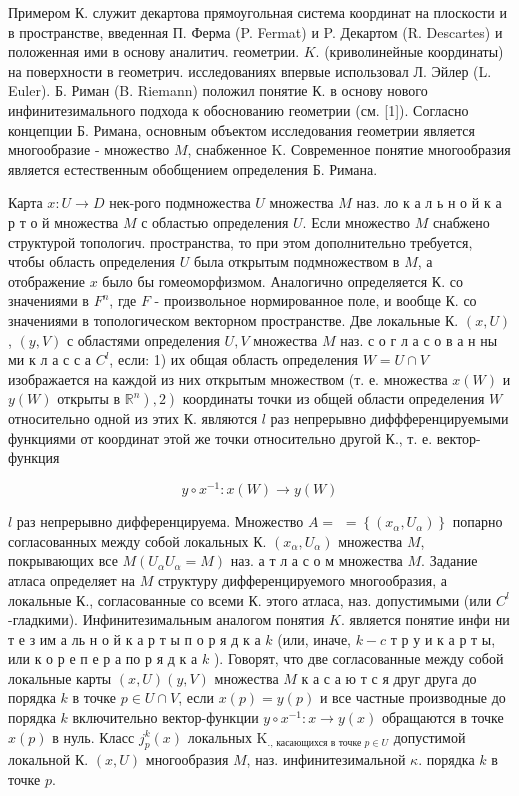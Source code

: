 \documentclass[10pt]{article}
\begin{document}
Примером К. служит декартова прямоугольная система координат на плоскости и в пространстве, введенная П. Ферма (P. Fermat) и P. Декартом (R. Descartes) и положенная ими в основу аналитич. геометрии. $K$. (криволинейные координаты) на поверхности в геометрич. исследованиях впервые использовал Л. Эйлер (L. Euler). Б. Риман (B. Riemann) положил понятие К. в основу нового инфинитезимального подхода к обоснованию геометрии (см. [1]). Согласно концепции Б. Римана, основным объектом исследования геометрии является многообразие - множество $M$, снабженное K. Современное понятие многообразия является естественным обобщением определения Б. Римана.



Карта $x: U \rightarrow D$ нек-рого подмножества $U$ множества $M$ наз. ло к а л ь н о й к а р т о й множества $M$ с областью определения $U$. Если множество $M$ снабжено структурой топологич. пространства, то при этом дополнительно требуется, чтобы область определения $U$ была открытым подмножеством в $M$, а отображение $x$ было бы гомеоморфизмом. Аналогично определяется К. со значениями в $F^{n}$, где $F$ - произвольное нормированное поле, и вообще К. со значениями в топологическом векторном пространстве. Две локальные К. $(x, U)$, $(y, V)$ с областями определения $U, V$ множества $M$ наз. с о г л а с о в а н ны ми к л а с с а $C^{l}$, если: 1) их общая область определения $W=U \cap V$ изображается на каждой из них открытым множеством (т. е. множества $x(W)$ и $y(W)$ открыты в $\left.\left.\mathbb{R}^{n}\right), 2\right)$ координаты точки из общей области определения $W$ относительно одной из этих К. являются $l$ раз непрерывно диффференцируемыми функциями от координат этой же точки относительно другой К., т. е. вектор-функция



\[

y \circ x^{-1}: x(W) \rightarrow y(W)

\]



$l$ раз непрерывно дифференцируема. Множество $A=$ $=\left\{\left(x_{\alpha}, U_{\alpha}\right)\right\}$ попарно согласованных между собой локальных К. $\left(x_{\alpha}, U_{\alpha}\right)$ множества $M$, покрывающих все $M\left(U_{\alpha} U_{\alpha}=M\right)$ наз. а т л а с о м множества $M$. Задание атласа определяет на $M$ структуру дифференцируемого многообразия, а локальные К., согласованные со всеми К. этого атласа, наз. допустимыми (или $C^{l}$-гладкими). Инфинитезимальным аналогом понятия $K$. является понятие инфи ни т е з им а ль н о й к а р т ы п о р я д к а $k$ (или, иначе, $k-c$ т р у и к а р т ы, или к о р е п е р а по р я д к а $k$ ). Говорят, что две согласованные между собой локальные карты $(x, U)(y, V)$ множества $M$ к а с а ю т с я друг друга до порядка $k$ в точке $p \in U \cap V$, если $x(p)=y(p)$ и все частные производные до порядка $k$ включительно вектор-функции $y \circ x^{-1}: x \rightarrow y(x)$ обращаются в точке $x(p)$ в нуль. Класс $j_{p}^{k}(x)$ локальных $\mathrm{K}_{\text {., касающихся в точке } p \in U}$ допустимой локальной К. $(x, U)$ многообразия $M$, наз. инфинитезимальной $\kappa$. порядка $k$ в точке $p$.
\end{document}
